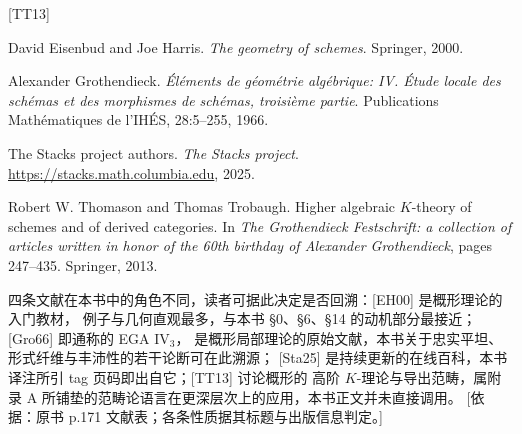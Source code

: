 \renewcommand{\refname}{参考文献}

\begin{thebibliography}{[TT13]}

David Eisenbud and Joe Harris.
\newblock \emph{The geometry of schemes}.
\newblock Springer, 2000.

Alexander Grothendieck.
\newblock \emph{\'El\'ements de g\'eom\'etrie alg\'ebrique: IV. \'Etude locale des sch\'emas et des
  morphismes de sch\'emas, troisi\`eme partie}.
\newblock Publications Math\'ematiques de l'IH\'ES, 28:5--255, 1966.

The Stacks project authors.
\newblock \emph{The Stacks project}.
\newblock \url{https://stacks.math.columbia.edu}, 2025.

Robert W. Thomason and Thomas Trobaugh.
\newblock Higher algebraic $K$-theory of schemes and of derived categories.
\newblock In \emph{The Grothendieck Festschrift: a collection of articles written in honor of the
  60th birthday of Alexander Grothendieck}, pages 247--435. Springer, 2013.

\end{thebibliography}

\begin{yizhu}
四条文献在本书中的角色不同，读者可据此决定是否回溯：\textup{[EH00]} 是概形理论的入门教材，
例子与几何直观最多，与本书 §0、§6、§14 的动机部分最接近；\textup{[Gro66]} 即通称的 EGA IV$_3$，
是概形局部理论的原始文献，本书关于忠实平坦、形式纤维与丰沛性的若干论断可在此溯源；
\textup{[Sta25]} 是持续更新的在线百科，本书译注所引 tag 页码即出自它；\textup{[TT13]} 讨论概形的
高阶 $K$-理论与导出范畴，属附录 A 所铺垫的范畴论语言在更深层次上的应用，本书正文并未直接调用。
[依据：原书 p.171 文献表；各条性质据其标题与出版信息判定。]
\end{yizhu}
